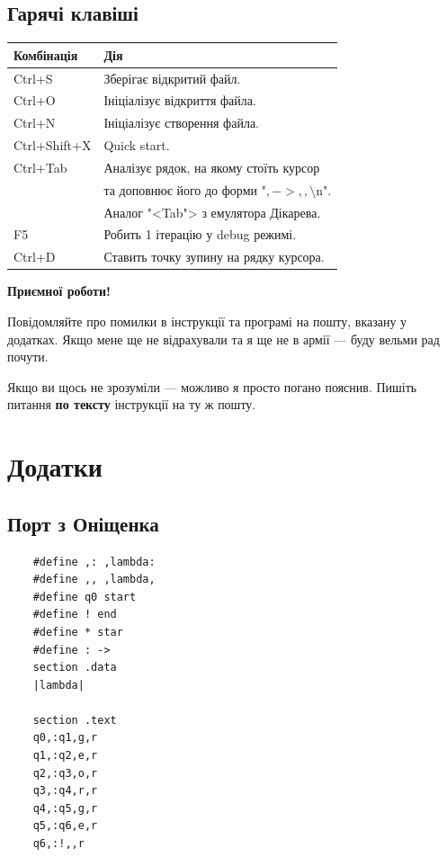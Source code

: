 \documentclass[oneside,final,14pt]{extreport}
\begin{document}
\section{Гарячі клавіші}
\label{sec:hotkeys}
\begin{tabular}{| l | l |}
	\hline
	Комбінація & Дія \\
	\hline
	Ctrl+S & Зберігає відкритий файл. \\
	\hline
	Ctrl+O & Ініціалізує відкриття файла. \\
	\hline
	Ctrl+N & Ініціалізує створення файла. \\
	\hline
	Ctrl+Shift+X & Quick start. \\
	\hline
	Ctrl+Tab & Аналізує рядок, на якому стоїть курсор \\
	 		 &  та доповнює його до форми "$,->,,\setminus$n".\\
			 & Аналог "<Tab"> з емулятора Дікарева.\\
	\hline
	F5 & Робить 1 ітерацію у debug режимі.\\
	\hline
	Ctrl+D & Ставить точку зупину на рядку курсора.\\
	\hline 
\end{tabular}
\bigskip

\textbf{{\large Приємної роботи!}}

Повідомляйте про помилки в інструкції та програмі на пошту, вказану у додатках. Якщо мене ще не відрахували та я ще не в армії --- буду вельми рад почути.

Якщо ви щось не зрозуміли --- можливо я просто погано пояснив. Пишіть питання  {\bfseries по тексту} інструкції на ту ж пошту.

\chapter*{Додатки} 
\section*{Порт з Оніщенка}
\begin{verbatim}
	#define ,: ,lambda:
	#define ,, ,lambda,
	#define q0 start
	#define ! end
	#define * star
	#define : ->
	section .data
	|lambda|

	section .text
	q0,:q1,g,r
	q1,:q2,e,r
	q2,:q3,o,r
	q3,:q4,r,r
	q4,:q5,g,r
	q5,:q6,e,r
	q6,:!,,r
\end{verbatim}
\end{document}
